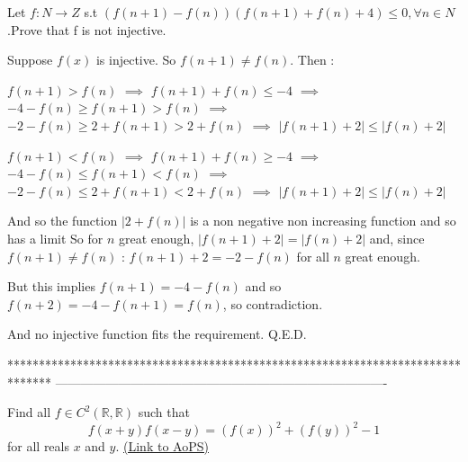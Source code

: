 \begin{solution}
	\begin{tcolorbox}Let $ f: N \to Z$ s.t $ (f(n + 1) - f(n))(f(n + 1) + f(n) + 4)\leq0,\forall n\in N$.Prove that f is not injective.\end{tcolorbox}

Suppose $ f(x)$ is injective. So $ f(n+1)\neq f(n)$. Then : 

$ f(n+1)>f(n)$ $ \implies$ $ f(n+1)+f(n)\leq -4$ $ \implies$ $ -4-f(n)\geq f(n+1)>f(n)$ $ \implies$ $ -2-f(n)\geq 2+f(n+1)>2+f(n)$ $ \implies$ $ |f(n+1)+2|\leq |f(n)+2|$

$ f(n+1)<f(n)$ $ \implies$ $ f(n+1)+f(n)\geq -4$ $ \implies$ $ -4-f(n)\leq f(n+1)<f(n)$ $ \implies$ $ -2-f(n)\leq 2+f(n+1)<2+f(n)$ $ \implies$ $ |f(n+1)+2|\leq |f(n)+2|$

And so the function $ |2+f(n)|$ is a non negative non increasing function and so has a limit
So for $ n$ great enough, $ |f(n+1)+2|=|f(n)+2|$ and, since $ f(n+1)\neq f(n)$ : $ f(n+1)+2=-2-f(n)$ for all $ n$ great enough.

But this implies $ f(n+1)=-4-f(n)$ and so $ f(n+2)=-4-f(n+1)=f(n)$, so contradiction.

And no injective function fits the requirement.
Q.E.D.
\end{solution}
*******************************************************************************
-------------------------------------------------------------------------------

\begin{problem}
	Find all $ f\in{C}^{2}(\mathbb{R},\mathbb{R})$ such that
\[f(x+y)f(x-y)=(f(x))^{2}+(f(y))^{2}-1\]
for all reals $x$ and $y$.
	\flushright \href{https://artofproblemsolving.com/community/c6h298996}{(Link to AoPS)}
\end{problem}



